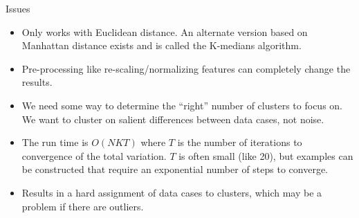 \documentclass[serif,xcolor=pdftex,dvipsnames,table,hyperref={bookmarks=false,breaklinks}]{beamer}
\begin{document}
\begin{frame}[t]{Issues}

\begin{itemize}
\item Only works with Euclidean distance. An alternate version based on 
Manhattan distance exists and is called the K-medians algorithm.

\pause\item Pre-processing like re-scaling/normalizing features can
completely change the results.

\pause\item We need some way to determine the ``right'' number of clusters to 
focus on. We want to cluster on salient differences between data cases, not 
noise.

\pause \item The run time is $O(NKT)$ where $T$ is the number of iterations to
convergence of the total variation. $T$ is often small (like 20), but examples 
can be constructed that require an exponential number of steps to converge. 

\pause \item Results in a hard assignment of data cases to clusters, which may 
be a 
problem if there are outliers.

\end{itemize}
\end{frame}
\end{document}

